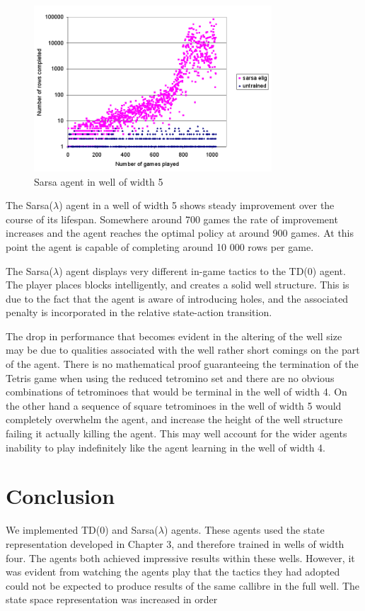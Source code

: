 \documentclass{rucsthesis}
\begin{document}
\begin{figure}[h]
\centering
\includegraphics[width=3.5in]{sarsaeligredtet5well.png}
\caption{Sarsa agent in well of width 5}
\label{fig:sarsaeligredtet5well}
\end{figure}

The Sarsa($\lambda$) agent in a well of width 5 shows steady improvement over the course of its lifespan. Somewhere around 700 games the rate of improvement increases and the agent reaches the optimal policy at around 900 games. At this point the agent is capable of completing around 10 000 rows per game.

The Sarsa($\lambda$) agent displays very different in-game tactics to the TD(0) agent. The player places blocks intelligently, and creates a solid well structure. This is due to the fact that the agent is aware of introducing holes, and the associated penalty is incorporated in the relative state-action transition.

The drop in performance that becomes evident in the altering of the well size may be due to qualities associated with the well rather short comings on the part of the agent. There is no mathematical proof guaranteeing the termination of the Tetris game when using the reduced tetromino set and there are no obvious combinations of tetrominoes that would be terminal in the well of width 4. On the other hand a sequence of square tetrominoes in the well of width 5 would completely overwhelm the agent, and increase the height of the well structure failing it actually killing the agent. This may well account for the wider agents inability to play indefinitely like the agent learning in the well of width 4.

\section{Conclusion}

We implemented TD(0) and Sarsa($\lambda$) agents. These agents used the state representation developed in Chapter 3, and therefore trained in wells of width four. The agents both achieved impressive results within these wells. However, it was evident from watching the agents play that the tactics they had adopted could not be expected to produce results of the same callibre in the full well. The state space representation was increased in order 
\end{document}
